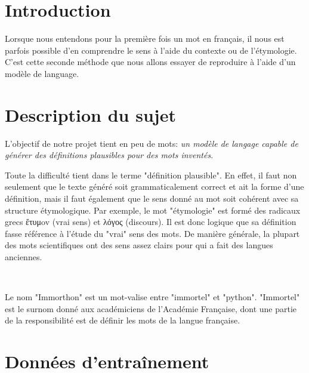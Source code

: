 \documentclass[french]{template}
\begin{document}


\fairemarges
\fairepagedegarde
\tabledematieres

\section{Introduction}

Lorsque nous entendons pour la première fois un mot en français, il nous est parfois possible d'en comprendre le sens à l'aide du contexte ou de l'étymologie. C'est cette seconde méthode que nous allons essayer de reproduire à l'aide d'un modèle de language.

\section{Description du sujet}

L'objectif de notre projet tient en peu de mots: \textit{un modèle de langage capable de générer des définitions plausibles pour des mots inventés}.

Toute la difficulté tient dans le terme "définition plausible". En effet, il faut non seulement que le texte généré soit grammaticalement correct et ait la forme d'une définition, mais il faut également que le sens donné au mot soit cohérent avec sa structure étymologique. Par exemple, le mot "étymologie" est formé des radicaux grecs {ἔτυμov} (vrai sens) et {λόγος} (discours). Il est donc logique que sa définition fasse référence à l'étude du "vrai" sens des mots. De manière générale, la plupart des mots scientifiques ont des sens assez clairs pour qui a fait des langues anciennes.

\

Le nom "Immorthon" est un mot-valise entre "immortel" et "python". "Immortel" est le
surnom donné aux académiciens de l’Académie Française, dont une partie de la responsibilité
est de définir les mots de la langue française.

\section{Données d'entraînement}
\end{document}
